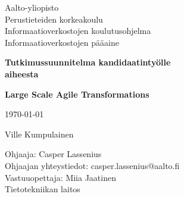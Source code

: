 \begin{titlepage}

	\begin{flushleft}
	\begin{minipage}{15cm}
		\linespread{1.0}\small
		Aalto-yliopisto \\
		Perustieteiden korkeakoulu \\
		Informaatioverkostojen koulutusohjelma \\
		Informaatioverkostojen pääaine
		\par
	\end{minipage}
	\end{flushleft}
	\centering
	\vspace{1.5cm}
	{\large\bfseries Tutkimussuunnitelma kandidaatintyölle \\ aiheesta \par}
	{\LARGE\bfseries Large Scale Agile Transformations\par}
	\vspace{1.5cm}
	{\large \today\par}
	{\Large Ville Kumpulainen \par}
	\vfill

	\begin{flushleft}
	\begin{minipage}{15cm}
		\linespread{1.0}\small
		Ohjaaja: Casper Lassenius \\
		Ohjaajan yhteystiedot: casper.lassenius@aalto.fi \\
		Vastuuopettaja: Miia Jaatinen \\
		Tietotekniikan laitos
		\par
	\end{minipage}
	\end{flushleft}


\end{titlepage}
